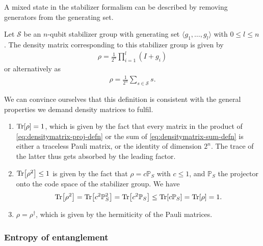 A mixed state in the stabilizer formalism can be described by removing
generators from the generating set. 
\begin{defn}\label{defn:stab-dmat}
  Let $\mathcal{S}$ be an $n$-qubit stabilizer group with generating set
  $\langle g_1, \ldots, g_l \rangle$ with $0 \leq l \leq n$. The density matrix
  corresponding to this stabilizer group is given by
  \begin{align}\label{eq:densitymatrix-proj-defn}
    \rho = \frac{1}{2^n} \prod_{i=1}^l (I + g_i)
  \end{align}
  or alternatively as
  \begin{align}\label{eq:densitymatrix-sum-defn}
    \rho = \frac{1}{2^n} \sum_{s \in \mathcal{S}} s
  .\end{align}
\end{defn}
We can convince ourselves that this definition is consistent with the general
properties we demand density matrices to fulfil. 
\begin{enumerate}
  \item $\Tr[\rho] = 1$, which is given by the fact that every matrix in the
    product of \cref{eq:densitymatrix-proj-defn} or the sum of
    \cref{eq:densitymatrix-sum-defn} is either a traceless Pauli matrix, or the
    identity of dimension $2^n$. The trace of the latter thus gets absorbed by
    the leading factor.
  \item $\Tr[\rho^2] \leq 1$ is given by the fact that $\rho = c\mathbb{P}_S$
    with $c\leq 1$, and $\mathbb{P}_S$ the projector onto the code space of the
    stabilizer group. We have
    \begin{align}
       \Tr[\rho^2]=\Tr[c^2 \mathbb{P}^2_S] =\Tr[c^2\mathbb{P}_S]
        \leq \Tr[c\mathbb{P}_S] = \Tr[\rho] = 1
    .\end{align}
  \item $\rho = \rho^\dagger$, which is given by the hermiticity of the Pauli
    matrices.
\end{enumerate}

\subsubsection{Entropy of entanglement}

